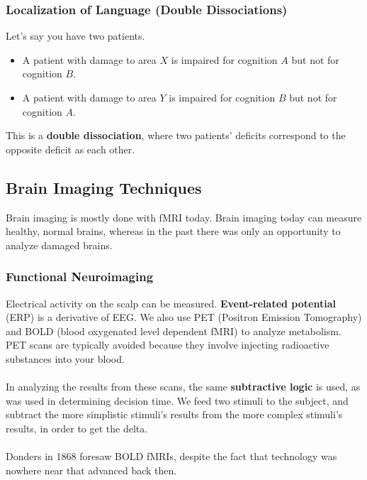 \documentclass[]{article}
\begin{document}
			\subsubsection{Localization of Language (Double Dissociations)}
				Let's say you have two patients.
				\begin{itemize}
					\item A patient with damage to area $X$ is impaired for cognition $A$ but not for cognition $B$.
					\item A patient with damage to area $Y$ is impaired for cognition $B$ but not for cognition $A$.
				\end{itemize}

				This is a \textbf{double dissociation}, where two patients' deficits correspond to the opposite deficit as each other.

		\subsection{Brain Imaging Techniques}
			Brain imaging is mostly done with fMRI today. Brain imaging today can measure healthy, normal brains, whereas in the past there was only an opportunity to analyze damaged brains.
			\subsubsection{Functional Neuroimaging}
				Electrical activity on the scalp can be measured. \textbf{Event-related potential} (ERP) is a derivative of EEG. We also use PET (Positron Emission Tomography) and BOLD (blood oxygenated level dependent fMRI) to analyze metabolism. PET scans are typically avoided because they involve injecting radioactive substances into your blood.
				\\ \\
				In analyzing the results from these scans, the same \textbf{subtractive logic} is used, as was used in determining decision time. We feed two stimuli to the subject, and subtract the more simplistic stimuli's results from the more complex stimuli's results, in order to get the delta.
				\\ \\
				Donders in 1868 foresaw BOLD fMRIs, despite the fact that technology was nowhere near that advanced back then.
\end{document}
